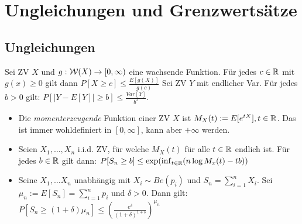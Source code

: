 
\section{Ungleichungen und Grenzwertsätze}
\subsection{Ungleichungen}
\begin{itemize}
     Sei ZV $X$ und $g: \mathcal{W}(X) \to [0, \infty)$ eine wachsende Funktion. Für jedes $c \in \mathbb{R}$ mit $g(x) \ge 0$ gilt dann $P[X \ge c] \le \frac{E[g(X)]}{g(c)}$
     Sei ZV $Y$ mit endlicher Var. Für jedes $b > 0$ gilt: $P[|Y - E[Y] \mid \ge b] \le \frac{Var[Y]}{b^2}$.
        \begin{itemize}
            \item Die \textit{momenterzeugende} Funktion einer ZV $X$ ist $M_X(t) := E[e^{tX}], t \in \mathbb{R}$. Das ist immer wohldefiniert in $[0, \infty]$, kann aber $+\infty$ werden.
            \item Seien $X_1, \dots, X_n$ i.i.d. ZV, für welche $M_X(t)$ für alle $t \in \mathbb{R}$ endlich ist. Für jedes $b \in \mathbb{R}$ gilt dann: $P[S_n \ge b] \le \exp(\inf_{t \in \mathbb{R}} (n \log M_x(t) - tb))$
            \item Seine $X_1, \dots X_n$ unabhängig mit $X_i \sim Be(p_i)$ und $S_n = \sum_{i=1}^{n} X_i$. Sei $\mu_n := E[S_n] = \sum_{i=1}^{n} p_i$ und $\delta > 0$. Dann gilt: $P[S_n \ge (1 + \delta) \mu_n] \le (\frac{e^\delta}{(1 + \delta)^{1 + \delta}})^{\mu_n}$
        \end{itemize}
\end{itemize}

